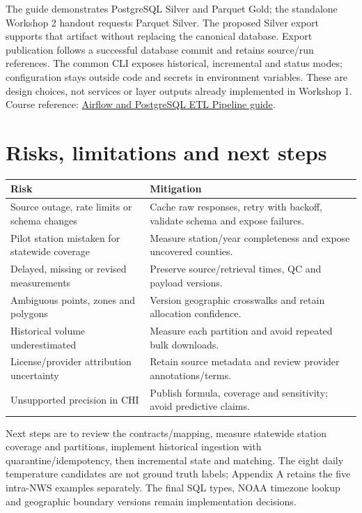 The guide demonstrates PostgreSQL Silver and Parquet Gold; the standalone
Workshop 2 handout requests Parquet Silver. The proposed Silver export supports
that artifact without replacing the canonical database. Export publication follows
a successful database commit and retains source/run references. The common CLI
exposes historical, incremental and status modes; configuration stays outside
code and secrets in environment variables. These are design choices, not services
or layer outputs already implemented in Workshop 1. Course reference:
\href{https://github.com/EngAndres/ud-public/blob/main/courses/data-analysis-programming/guides/Airflow-PostgreSQL-ETL.pdf}{Airflow and PostgreSQL ETL Pipeline guide}.

\FloatBarrier
\section{Risks, limitations and next steps}
\begin{tabularx}{\textwidth}{YY}
\toprule Risk & Mitigation \\
\midrule
Source outage, rate limits or schema changes & Cache raw responses, retry with backoff, validate schema and expose failures. \\
Pilot station mistaken for statewide coverage & Measure station/year completeness and expose uncovered counties. \\
Delayed, missing or revised measurements & Preserve source/retrieval times, QC and payload versions. \\
Ambiguous points, zones and polygons & Version geographic crosswalks and retain allocation confidence. \\
Historical volume underestimated & Measure each partition and avoid repeated bulk downloads. \\
License/provider attribution uncertainty & Retain source metadata and review provider annotations/terms. \\
Unsupported precision in CHI & Publish formula, coverage and sensitivity; avoid predictive claims. \\
\bottomrule
\end{tabularx}
Next steps are to review the contracts/mapping, measure statewide station coverage
and partitions, implement historical ingestion with quarantine/idempotency, then
incremental state and matching. The eight daily temperature candidates are not
ground truth labels; Appendix A retains the five intra-NWS examples separately.
The final SQL types, NOAA timezone lookup and geographic boundary
versions remain implementation decisions.

